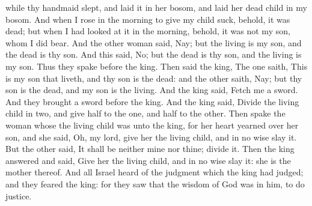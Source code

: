 while thy handmaid slept, and laid it in her bosom, and laid her dead child in my bosom. And when I rose in the morning to give my child suck, behold, it was dead; but when I had looked at it in the morning, behold, it was not my son, whom I did bear. And the other woman said, Nay; but the living is my son, and the dead is thy son. And this said, No; but the dead is thy son, and the living is my son. Thus they spake before the king.  Then said the king, The one saith, This is my son that liveth, and thy son is the dead: and the other saith, Nay; but thy son is the dead, and my son is the living. And the king said, Fetch me a sword. And they brought a sword before the king. And the king said, Divide the living child in two, and give half to the one, and half to the other. Then spake the woman whose the living child was unto the king, for her heart yearned over her son, and she said, Oh, my lord, give her the living child, and in no wise slay it. But the other said, It shall be neither mine nor thine; divide it. Then the king answered and said, Give her the living child, and in no wise slay it: she is the mother thereof. And all Israel heard of the judgment which the king had judged; and they feared the king: for they saw that the wisdom of God was in him, to do justice. 

